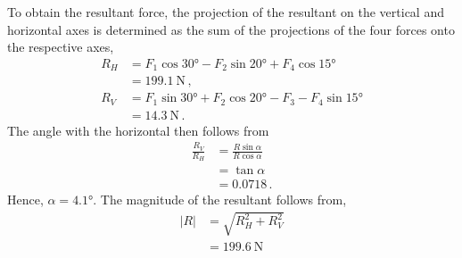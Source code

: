 To obtain the resultant force, the projection of the resultant on the vertical and horizontal axes is determined as the sum of the projections of the four forces onto the respective axes,
\begin{align*}
	R_H	&=	F_1 \cos\ang{30} - F_2\sin\ang{20} + F_4 \cos\ang{15}\\
		&=	\SI{199.1}{\N}	\,,\\
	R_V	&=	F_1 \sin\ang{30} +F_2 \cos\ang{20}-F_3 -F_4\sin\ang{15}\\
		&=	\SI{14.3}{\N} \, .
\end{align*}
The angle with the horizontal then follows from
\begin{align*}
	\frac{R_V}{R_H}	&=	\frac{R\sin\alpha}{R\cos\alpha}\\
					&=	\tan\alpha \\
					&=0.0718\, .
\end{align*}
Hence, $\alpha=\ang{4.1}$. The magnitude of the resultant follows from,
\begin{align*}
	|R|	&=\sqrt{R_H^2+R_V^2}\\
			&=	\SI{199.6}{\N}
\end{align*}
\clearpage